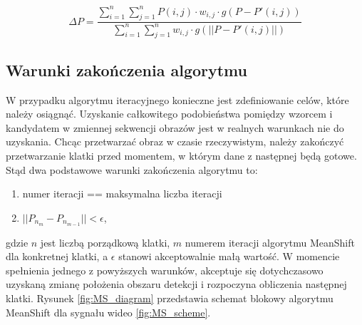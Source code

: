 \begin{equation}
\label{eq:position}
\Delta P=\frac{\sum_{i=1}^{n}\sum_{j=1}^{n}P(i,j)\cdot w_{i,j}\cdot g(P-P'(i,j))}{\sum_{i=1}^{n}\sum_{j=1}^{n}w_{i,j}\cdot g(||P-P'(i,j)||)}
\end{equation}

\subsection{Warunki zakończenia algorytmu}

W przypadku algorytmu iteracyjnego konieczne jest zdefiniowanie celów, które należy osiągnąć. 
Uzyskanie całkowitego podobieństwa pomiędzy wzorcem i kandydatem w zmiennej sekwencji obrazów jest w realnych warunkach nie do uzyskania. %
Chcąc przetwarzać obraz w czasie rzeczywistym, należy zakończyć przetwarzanie klatki przed momentem, w którym dane z następnej będą gotowe. 
Stąd dwa podstawowe warunki zakończenia algorytmu to:
\begin{enumerate}
	\item numer iteracji == maksymalna liczba iteracji
	\item $||P_{n_m}-P_{n_{m-1}}||<\epsilon$, %
\end{enumerate} 
gdzie $n$ jest liczbą porządkową klatki, $m$ numerem iteracji algorytmu MeanShift dla konkretnej klatki, a $\epsilon$ stanowi akceptowalnie małą wartość.
W momencie spełnienia jednego z powyższych warunków, akceptuje się dotychczasowo uzyskaną zmianę położenia obszaru detekcji i rozpoczyna obliczenia następnej klatki. Rysunek \ref{fig:MS_diagram} przedstawia schemat blokowy algorytmu MeanShift dla sygnału wideo \ref{fig:MS_scheme}. %
